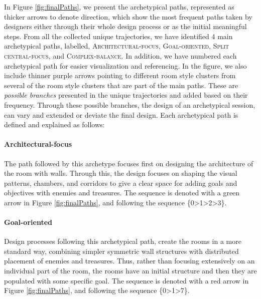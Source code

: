 In Figure \ref{fig:finalPaths}, we present the archetypical paths, represented as thicker arrows to denote direction, which show the most frequent paths taken by designers either through their whole design process or as the initial meaningful steps. From all the collected unique trajectories, we have identified 4 main archetypical paths, labelled, \textsc{Architectural-focus}, \textsc{Goal-oriented}, \textsc{Split central-focus}, and \textsc{Complex-balance}. In addition, we have numbered each archetypical path for easier visualization and referencing. In the figure, we also include thinner purple arrows pointing to different room style clusters from several of the room style clusters that are part of the main paths. These are \textit{possible branches} presented in the unique trajectories and added based on their frequency. Through these possible branches, the design of an archetypical session, can vary and extended or deviate the final design. Each archetypical path is defined and explained as follows: 




\paragraph{Architectural-focus}The path followed by this archetype focuses first on designing the architecture of the room with walls. Through this, the design focuses on shaping the visual patterns, chambers, and corridors to give a clear space for adding goals and objectives with enemies and treasures. The sequence is denoted with a green arrow in Figure \ref{fig:finalPaths}, and following the sequence \{0\textgreater1\textgreater2\textgreater3\}.

\paragraph{Goal-oriented}Design processes following this archetypical path, create the rooms in a more standard way, combining simpler symmetric wall structures with distributed placement of enemies and treasures. Thus, rather than focusing extensively on an individual part of the room, the rooms have an initial structure and then they are populated with some specific goal. The sequence is denoted with a red arrow in Figure \ref{fig:finalPaths}, and following the sequence \{0\textgreater1\textgreater7\}.

